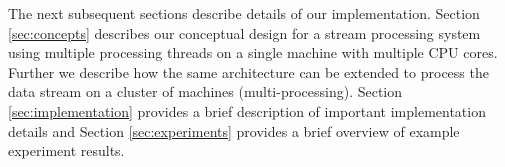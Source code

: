 The next subsequent sections describe details of our implementation. Section \ref{sec:concepts} describes our conceptual design for
a stream processing system using multiple processing threads on a single machine with multiple CPU cores. Further we describe how the same
architecture can be extended to process the data stream on a cluster of machines (multi-processing).  Section \ref{sec:implementation} provides
a brief description of important implementation details and Section \ref{sec:experiments} provides a brief overview of example
experiment results.

